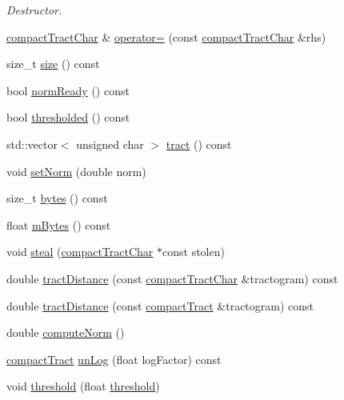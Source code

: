 \begin{DoxyCompactItemize}
\begin{DoxyCompactList}\small\item\em \-Destructor. \end{DoxyCompactList}\item 
\hyperlink{classcompactTractChar}{compact\-Tract\-Char} \& \hyperlink{classcompactTractChar_a61191ab3d7b42721af825753cddbb2e9}{operator=} (const \hyperlink{classcompactTractChar}{compact\-Tract\-Char} \&rhs)
\item 
size\-\_\-t \hyperlink{classcompactTractChar_acf80c0c66326263ce7bcbecd5748b04a}{size} () const 
\item 
bool \hyperlink{classcompactTractChar_a9896c20884f111fc538043b66f8bff8c}{norm\-Ready} () const 
\item 
bool \hyperlink{classcompactTractChar_a2efe0db2fa00e2fbe4a9e14aaf9072f1}{thresholded} () const 
\item 
std\-::vector$<$ unsigned char $>$ \hyperlink{classcompactTractChar_a54b91d2633515fbb4882d9c2d41001a5}{tract} () const 
\item 
void \hyperlink{classcompactTractChar_a69c45b4c8f8ea53a8eb27116374f9a31}{set\-Norm} (double norm)
\item 
size\-\_\-t \hyperlink{classcompactTractChar_aac432832581eeb337ff995df47347f96}{bytes} () const 
\item 
float \hyperlink{classcompactTractChar_a0fe5bedd0701880d1d71b475874140ba}{m\-Bytes} () const 
\item 
void \hyperlink{classcompactTractChar_abb44c70d5001231f06e9eb5f0f061e0a}{steal} (\hyperlink{classcompactTractChar}{compact\-Tract\-Char} $\ast$const stolen)
\item 
double \hyperlink{classcompactTractChar_ad63835a4e25c915f59dfdfefd8d553de}{tract\-Distance} (const \hyperlink{classcompactTractChar}{compact\-Tract\-Char} \&tractogram) const 
\item 
double \hyperlink{classcompactTractChar_ad1c656fa21770132aa708cdbfec12c3a}{tract\-Distance} (const \hyperlink{classcompactTract}{compact\-Tract} \&tractogram) const 
\item 
double \hyperlink{classcompactTractChar_aef4eb7d55252ec902fae6768d72b133c}{compute\-Norm} ()
\item 
\hyperlink{classcompactTract}{compact\-Tract} \hyperlink{classcompactTractChar_a84a56f4467d82fa9c40be830f1b92ca3}{un\-Log} (float log\-Factor) const 
\item 
void \hyperlink{classcompactTractChar_aeb691e1cb50cbdb928816386e6ccceae}{threshold} (float \hyperlink{classcompactTractChar_aeb691e1cb50cbdb928816386e6ccceae}{threshold})
\end{DoxyCompactItemize}
